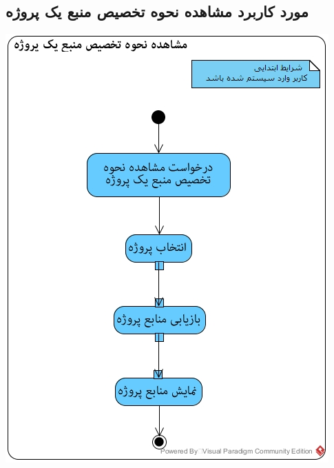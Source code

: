 \subsection*{مورد کاربرد مشاهده نحوه تخصیص منبع یک پروژه}
\vspace{2cm}
\begin{center}
\includegraphics[width=\textwidth]{ActivityDiagrams/38.jpg}
\end{center}

\newpage
\vspace{2cm}
